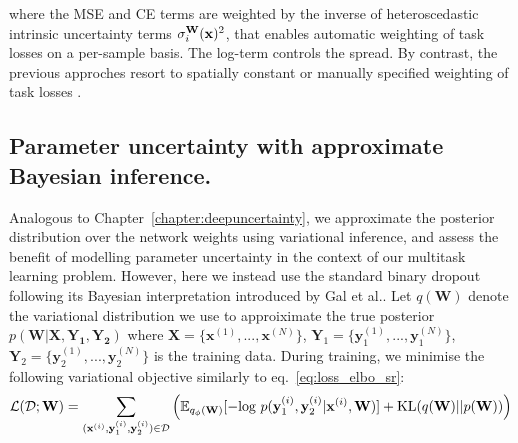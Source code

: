 where the MSE and CE terms are weighted by the inverse of heteroscedastic intrinsic uncertainty terms $\sigma^{\mathbf{W}}_{i}(\text{\textbf{x}})^2$, that enables automatic weighting of task losses on a per-sample basis. The log-term controls the spread. By contrast, the previous approches resort to spatially constant \cite{kendall2017multi} or manually specified weighting of task losses  \cite{moeskops2016deep,tanno2018autodvt}. 

\subsection{Parameter uncertainty with approximate Bayesian inference.} Analogous to Chapter~\ref{chapter:deepuncertainty}, we approximate the posterior distribution over the network weights using variational inference, and assess the benefit of modelling parameter uncertainty in the context of our multitask learning problem. However, here we instead use the standard binary dropout \cite{srivastava2014dropout} following its Bayesian interpretation introduced by Gal et al.\cite{gal2016dropout}. Let $q(\mathbf{W})$ denote the variational distribution we use to approiximate the true posterior $p(\mathbf{W}|\mathbf{X},\mathbf{Y_1},\mathbf{Y_2})$ where $\mathbf{X} = \{\mathbf{x}^{(1)}, ..., \mathbf{x}^{(N)}\}$, $\mathbf{Y}_1 = \{\mathbf{y}_1^{(1)}, ..., \mathbf{y}_1^{(N)}\}$, $\mathbf{Y}_2	 = \{\mathbf{y}_2^{(1)}, ..., \mathbf{y}_2^{(N)}\}$ is the training data. During training, we minimise the following variational objective similarly to eq.~\eqref{eq:loss_elbo_sr}:  
 \begin{equation}
 \mathcal{L}(\mathcal{D};\mathbf{W}) =  \sum_{(\mathbf{x}^{(i)},\mathbf{y}_1^{(i)},\mathbf{y}_2^{(i)})\in\mathcal{D}} \Big{(}  \mathbb{E}_{q_{\phi}(\text{\textbf{W}})}[- \text{log }p(\mathbf{y}_1^{(i)},\mathbf{y}_2^{(i)}|\mathbf{x}^{(i)},\text{\textbf{W}})]   +  \text{KL} (q(\text{\textbf{W}})||p(\text{\textbf{W}}))\Big{)}
 \end{equation}
 
